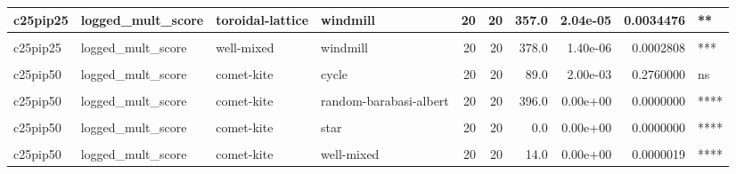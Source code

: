 \documentclass[
]{book}
\begin{document}
\begin{table}
\begin{tabular}{l|l|l|l|r|r|r|r|r|l}
\hline
c25pip25 & logged\_mult\_score & toroidal-lattice & windmill & 20 & 20 & 357.0 & 2.04e-05 & 0.0034476 & **\\
\hline
\cellcolor{gray!6}{c25pip25} & \cellcolor{gray!6}{logged\_mult\_score} & \cellcolor{gray!6}{well-mixed} & \cellcolor{gray!6}{wheel} & \cellcolor{gray!6}{20} & \cellcolor{gray!6}{20} & \cellcolor{gray!6}{200.0} & \cellcolor{gray!6}{1.00e+00} & \cellcolor{gray!6}{1.0000000} & \cellcolor{gray!6}{ns}\\
\hline
c25pip25 & logged\_mult\_score & well-mixed & windmill & 20 & 20 & 378.0 & 1.40e-06 & 0.0002808 & ***\\
\hline
\cellcolor{gray!6}{c25pip25} & \cellcolor{gray!6}{logged\_mult\_score} & \cellcolor{gray!6}{wheel} & \cellcolor{gray!6}{windmill} & \cellcolor{gray!6}{20} & \cellcolor{gray!6}{20} & \cellcolor{gray!6}{206.0} & \cellcolor{gray!6}{8.81e-01} & \cellcolor{gray!6}{1.0000000} & \cellcolor{gray!6}{ns}\\
\hline
c25pip50 & logged\_mult\_score & comet-kite & cycle & 20 & 20 & 89.0 & 2.00e-03 & 0.2760000 & ns\\
\hline
\cellcolor{gray!6}{c25pip50} & \cellcolor{gray!6}{logged\_mult\_score} & \cellcolor{gray!6}{comet-kite} & \cellcolor{gray!6}{linear-chain} & \cellcolor{gray!6}{20} & \cellcolor{gray!6}{20} & \cellcolor{gray!6}{83.0} & \cellcolor{gray!6}{1.00e-03} & \cellcolor{gray!6}{0.1430000} & \cellcolor{gray!6}{ns}\\
\hline
c25pip50 & logged\_mult\_score & comet-kite & random-barabasi-albert & 20 & 20 & 396.0 & 0.00e+00 & 0.0000000 & ****\\
\hline
\cellcolor{gray!6}{c25pip50} & \cellcolor{gray!6}{logged\_mult\_score} & \cellcolor{gray!6}{comet-kite} & \cellcolor{gray!6}{random-waxman} & \cellcolor{gray!6}{20} & \cellcolor{gray!6}{20} & \cellcolor{gray!6}{340.0} & \cellcolor{gray!6}{6.91e-05} & \cellcolor{gray!6}{0.0109869} & \cellcolor{gray!6}{*}\\
\hline
c25pip50 & logged\_mult\_score & comet-kite & star & 20 & 20 & 0.0 & 0.00e+00 & 0.0000000 & ****\\
\hline
\cellcolor{gray!6}{c25pip50} & \cellcolor{gray!6}{logged\_mult\_score} & \cellcolor{gray!6}{comet-kite} & \cellcolor{gray!6}{toroidal-lattice} & \cellcolor{gray!6}{20} & \cellcolor{gray!6}{20} & \cellcolor{gray!6}{17.0} & \cellcolor{gray!6}{0.00e+00} & \cellcolor{gray!6}{0.0000044} & \cellcolor{gray!6}{****}\\
\hline
c25pip50 & logged\_mult\_score & comet-kite & well-mixed & 20 & 20 & 14.0 & 0.00e+00 & 0.0000019 & ****\\

\end{tabular}
\end{table}
\end{document}
